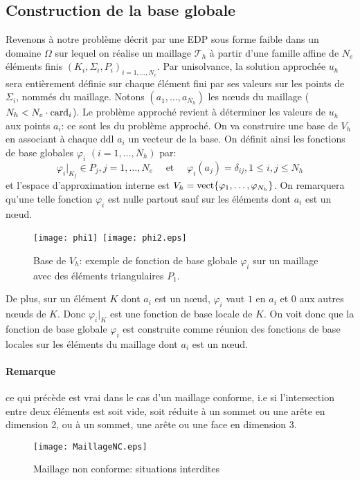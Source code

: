 \medskip
\subsection{Construction de la base globale}
Revenons à notre problème décrit par une EDP sous forme faible dans un domaine
$\Omega$ sur lequel on réalise un maillage $\mathcal{T}_h$ à partir d'une famille affine
de $N_e$ éléments finis $(K_i, \Sigma_i, P_i)_{i=1,\ldots,N_e}$.
\medskip
Par unisolvance, la solution approchée $u_h$ sera entièrement définie sur chaque élément fini
par ses valeurs sur les points de $\Sigma_i$, nommés  du maillage.
Notons $(a_1,\ldots, a_{N_h})$ les nœuds du maillage ($N_h<N_e \cdot \mathrm{card}_i$).
Le problème approché revient à déterminer les valeurs de $u_h$ aux points $a_i$:
ce sont les  du problème approché.
\medskip
On va construire une base de $V_h$ en associant à chaque ddl $a_i$ un vecteur de la base.
On définit ainsi les fonctions de base globales $\varphi_i$ $(i = 1,\ldots, N_h)$ par:
\begin{equation}\varphi_i|_{K_j} \in P_j, j = 1,\ldots, N_e \quad \text{ et }\quad \varphi_i(a_j) = \delta_{ij}, 1\le i,j\le N_h\end{equation}
et l'espace d'approximation interne est $V_h=\operatorname{vect}\{\varphi_1,\ldots, \varphi_{N_h}\}$.
On remarquera qu'une telle fonction $\varphi_i$ est nulle partout sauf sur les éléments
dont $a_i$ est un nœud.
\begin{figure}[ht]
\centering
\texttt{[image: phi1]}~\texttt{[image: phi2.eps]}
\caption{\label{BaseVh} Base de $V_h$: exemple de fonction de base globale $\varphi_i$ sur un maillage avec des éléments triangulaires $P_1$.}
\end{figure}

\medskip
De plus, sur un élément $K$ dont $a_i$ est un nœud, $\varphi_i$ vaut $1$ en $a_i$ et
$0$ aux autres nœuds de $K$. Donc $\varphi_i|_K$ est une fonction de base locale de $K$.
On voit donc que la fonction de base globale $\varphi_i$ est construite comme réunion des
fonctions de base locales sur les éléments du maillage dont $a_i$ est un nœud.

\medskip
\paragraph{Remarque} ce qui précède est vrai dans le cas d'un maillage conforme, i.e si
l'intersection entre deux éléments est soit vide, soit réduite à un
sommet ou une arête en dimension 2, ou à un sommet, une arête ou une face
en dimension 3.
\begin{figure}[ht]
\centering
\texttt{[image: MaillageNC.eps]}
\caption{Maillage non conforme: situations interdites}\label{maillageNC}
\end{figure}

